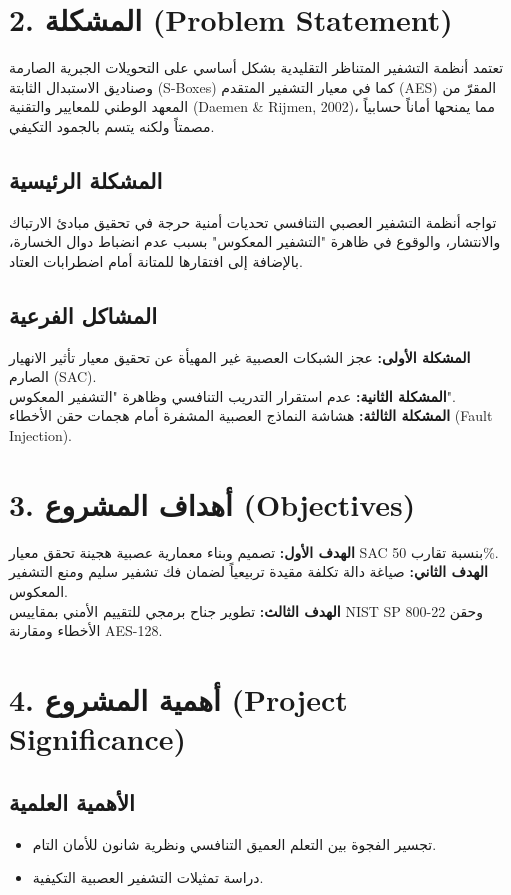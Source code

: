 \documentclass[12pt,a4paper]{article}
\begin{document}
\section*{2. المشكلة (Problem Statement)}
تعتمد أنظمة التشفير المتناظر التقليدية بشكل أساسي على التحويلات الجبرية الصارمة وصناديق الاستبدال الثابتة (S-Boxes) كما في معيار التشفير المتقدم (AES) المقرّ من المعهد الوطني للمعايير والتقنية (Daemen \& Rijmen, 2002)، مما يمنحها أماناً حسابياً مصمتاً ولكنه يتسم بالجمود التكيفي.

\subsection*{المشكلة الرئيسية}
تواجه أنظمة التشفير العصبي التنافسي تحديات أمنية حرجة في تحقيق مبادئ الارتباك والانتشار، والوقوع في ظاهرة "التشفير المعكوس" بسبب عدم انضباط دوال الخسارة، بالإضافة إلى افتقارها للمتانة أمام اضطرابات العتاد.

\subsection*{المشاكل الفرعية}
\textbf{المشكلة الأولى:} عجز الشبكات العصبية غير المهيأة عن تحقيق معيار تأثير الانهيار الصارم (SAC).\\
\textbf{المشكلة الثانية:} عدم استقرار التدريب التنافسي وظاهرة "التشفير المعكوس".\\
\textbf{المشكلة الثالثة:} هشاشة النماذج العصبية المشفرة أمام هجمات حقن الأخطاء (Fault Injection).

\section*{3. أهداف المشروع (Objectives)}
\textbf{الهدف الأول:} تصميم وبناء معمارية عصبية هجينة تحقق معيار SAC بنسبة تقارب 50\%.\\
\textbf{الهدف الثاني:} صياغة دالة تكلفة مقيدة تربيعياً لضمان فك تشفير سليم ومنع التشفير المعكوس.\\
\textbf{الهدف الثالث:} تطوير جناح برمجي للتقييم الأمني بمقاييس NIST SP 800-22 وحقن الأخطاء ومقارنة AES-128.

\newpage

\section*{4. أهمية المشروع (Project Significance)}
\subsection*{\color{navyblue}الأهمية العلمية}
\begin{itemize}
\item تجسير الفجوة بين التعلم العميق التنافسي ونظرية شانون للأمان التام.
\item دراسة تمثيلات التشفير العصبية التكيفية.
\end{itemize}
\end{document}
